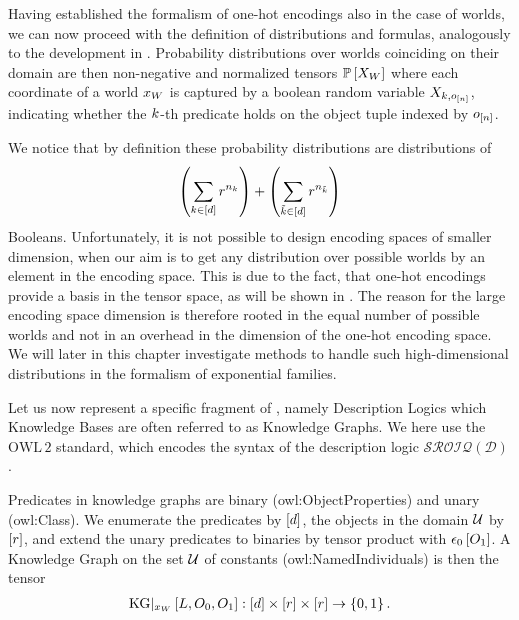 
Having established the formalism of one-hot encodings also in the case of \firstOrderLogic{} worlds, we can now proceed with the definition of distributions and formulas, analogously to the development in .
Probability distributions over worlds coinciding on their domain are then non-negative and normalized tensors $\mathbb{P}\left[X_{W}\right]$ where each coordinate of a world $x_{W}$ is captured by a boolean random variable $X_{k,o_{[n]}}$, indicating whether the $k$-th predicate holds on the object tuple indexed by $o_{[n]}$.

We notice that by definition these probability distributions are distributions of
\begin{align*}
    \left(\sum_{k\in[d]}r^{n_{k}}\right) +  \left(\sum_{\tilde{k}\in[d]}r^{n_{\tilde{k}}}\right)
\end{align*}
Booleans.
Unfortunately, it is not possible to design encoding spaces of smaller dimension, when our aim is to get any distribution over possible worlds by an element in the encoding space.
This is due to the fact, that one-hot encodings provide a basis in the tensor space, as will be shown in .
The reason for the large encoding space dimension is therefore rooted in the equal number of possible worlds and not in an overhead in the dimension of the one-hot encoding space.
We will later in this chapter investigate methods to handle such high-dimensional distributions in the formalism of exponential families.





\label{sec:kgRepresentation}

Let us now represent a specific fragment of \firstOrderLogic{}, namely Description Logics which Knowledge Bases are often referred to as Knowledge Graphs.
We here use the $\mathrm{OWL\,2}$ standard, which encodes the syntax of the description logic $\mathcal{SROIQ(D)}$ \cite{rudolph_foundations_2011}.


Predicates in knowledge graphs are binary (owl:ObjectProperties) and unary (owl:Class).
We enumerate the predicates by $[d]$, the objects in the domain $\mathcal{U}$ by $[r]$, and extend the unary predicates to binaries by tensor product with $\epsilon_{0}\left[O_{1}\right]$.
A Knowledge Graph on the set $\mathcal{U}$ of constants (owl:NamedIndividuals) is then the tensor
\begin{align*}
    \mathrm{KG}|_{x_{W}}\left[L,O_{0},O_{1}\right] : [d] \times [r] \times [r] \rightarrow \{0,1\} \, .
\end{align*}


